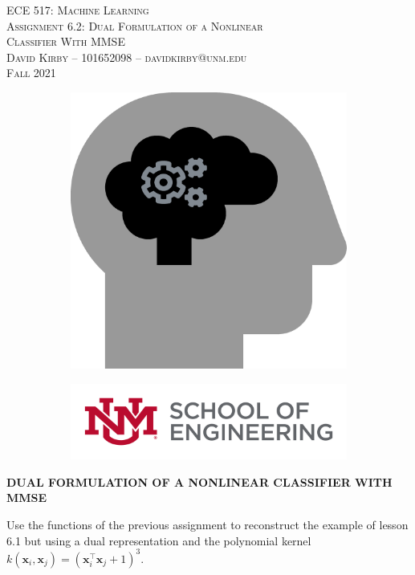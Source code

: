 \documentclass[11pt]{article}
\begin{document}
\setmainfont{SF Pro Text}
\setsansfont{SF Pro Text}
\setmonofont{SF Mono}
\renewcommand{\familydefault}{\sfdefault}

\thispagestyle{empty}
\begin{titlepage}
\vspace*{\fill}
\begin{center}
\textsc{\Huge{ECE 517: Machine Learning}}\\[3em]
\textsc{\LARGE Assignment 6.2: Dual Formulation of a Nonlinear\\[0.5em]Classifier With MMSE}\\[6em]
\textsc{\Large David Kirby -- 101652098 -- davidkirby@unm.edu}\\[3em]
\textsc{\Large Fall 2021}
\end{center}
\vfill
\begin{figure}[h]
\begin{subfigure}{0.5\textwidth}
\includegraphics[width=0.25\linewidth]{learning.png}
\end{subfigure}
\begin{subfigure}{0.6\textwidth}\hspace{1em}
\includegraphics[width=0.8\linewidth]{new-soe-logo.png}
\end{subfigure}
\end{figure}
\end{titlepage}
\setcounter{figure}{0}

\hypersetup{
    linkcolor=CrispBlue,
    urlcolor=CrispBlue,
    breaklinks=true
}

\textbf{DUAL FORMULATION OF A NONLINEAR CLASSIFIER WITH MMSE}

Use the functions of the previous assignment to reconstruct the example of lesson 6.1 but using a dual representation and the polynomial kernel \( k (\mathbf{x}_i, \mathbf{x}_j) = (\mathbf{x}_i^\top \mathbf{x}_j + 1)^3\).
\end{document}
